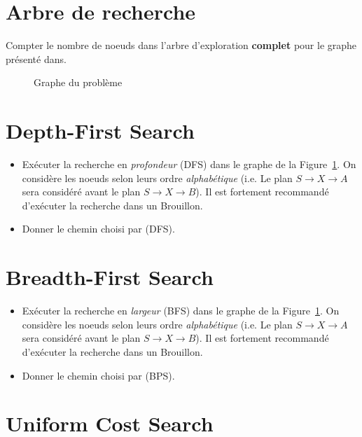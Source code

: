 \documentclass[12pt,letterpaper]{article}
\begin{document}
\section*{Arbre de recherche }%
\label{sec:probleme_1}
 Compter le nombre de noeuds dans l'arbre d'exploration \textbf{complet} pour
 le graphe présenté dans. 

\begin{figure}[htpb]
  \centering
  
  \caption{Graphe du problème}
  \label{fig:q1_graph}
\end{figure}


\section*{Depth-First Search}%
\label{sec:depth_first_search}
\begin{itemize}
  \item 
Exécuter la recherche en \emph{profondeur} (DFS) dans le graphe de la
Figure~\ref{fig:q1_graph}. On considère les noeuds selon leurs ordre
\emph{alphabétique} (i.e. Le plan $S\rightarrow X \rightarrow A$ sera considéré avant le plan
$S\rightarrow X\rightarrow B$). Il est fortement recommandé d'exécuter la recherche dans un
Brouillon.

\item Donner le chemin choisi par (DFS).
\end{itemize}

\section*{Breadth-First Search}%
\label{sec:}

\begin{itemize}
  \item 
Exécuter la recherche en \emph{largeur} (BFS) dans le graphe de la
Figure~\ref{fig:q1_graph}. On considère les noeuds selon leurs ordre
\emph{alphabétique} (i.e. Le plan $S\rightarrow X \rightarrow A$ sera considéré avant le plan
$S\rightarrow X\rightarrow B$). Il est fortement recommandé d'exécuter la recherche dans un
Brouillon.

\item Donner le chemin choisi par (BPS).
\end{itemize}


\section*{Uniform Cost Search}%
\label{sec:uniform_cost_search}
\end{document}
